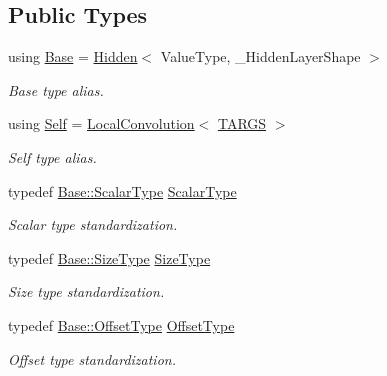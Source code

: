 \subsection*{Public Types}
\begin{DoxyCompactItemize}
\item 
using \hyperlink{classffnn_1_1layer_1_1_local_convolution_a743892f65df49f80cd171a1254cb7548}{Base} = \hyperlink{classffnn_1_1layer_1_1_hidden}{Hidden}$<$ Value\-Type, \-\_\-\-Hidden\-Layer\-Shape $>$
\begin{DoxyCompactList}\small\item\em Base type alias. \end{DoxyCompactList}\item 
using \hyperlink{classffnn_1_1layer_1_1_local_convolution_aeac716acfc0babed958f927490d17992}{Self} = \hyperlink{classffnn_1_1layer_1_1_local_convolution}{Local\-Convolution}$<$ \hyperlink{optimizer_2impl_2gradient__descent_2local__convolution_8hpp_a005b9b79411aa786124330e813a99057}{T\-A\-R\-G\-S} $>$
\begin{DoxyCompactList}\small\item\em Self type alias. \end{DoxyCompactList}\item 
typedef \hyperlink{classffnn_1_1layer_1_1internal_1_1_interface_a7f834e3365e5199bcbcd16d9abd63941}{Base\-::\-Scalar\-Type} \hyperlink{classffnn_1_1layer_1_1_local_convolution_a45fb8729213ea0bc40845cc1161fe229}{Scalar\-Type}
\begin{DoxyCompactList}\small\item\em Scalar type standardization. \end{DoxyCompactList}\item 
typedef \hyperlink{classffnn_1_1layer_1_1internal_1_1_interface_af0567642f60c65b5e87067226a54174b}{Base\-::\-Size\-Type} \hyperlink{classffnn_1_1layer_1_1_local_convolution_acb63c6ee4ca498d7992259aaa7246f26}{Size\-Type}
\begin{DoxyCompactList}\small\item\em Size type standardization. \end{DoxyCompactList}\item 
typedef \hyperlink{classffnn_1_1layer_1_1_hidden_ae2409b970adafb0ebc9b2eec62c4aac4}{Base\-::\-Offset\-Type} \hyperlink{classffnn_1_1layer_1_1_local_convolution_ade49c152e28ac5dd35427569ccbc332e}{Offset\-Type}
\begin{DoxyCompactList}\small\item\em Offset type standardization. \end{DoxyCompactList}\item 

\end{DoxyCompactItemize}
